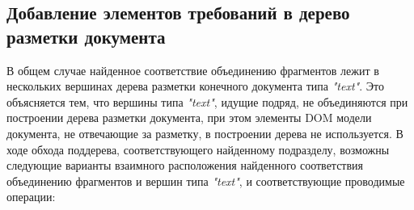 \subsection{Добавление элементов требований в дерево разметки документа}

В общем случае найденное соответствие объединению фрагментов лежит в нескольких вершинах дерева разметки конечного документа типа \emph{"text"}. Это объясняется тем, что вершины типа \emph{"text"}, идущие подряд, не объединяются при построении дерева разметки документа, при этом элементы DOM модели документа, не отвечающие за разметку, в построении дерева не используется. В ходе обхода поддерева, соответствующего найденному подразделу, возможны следующие варианты взаимного расположения найденного соответствия объединению фрагментов и вершин типа \emph{"text"}, и соответствующие проводимые операции:

